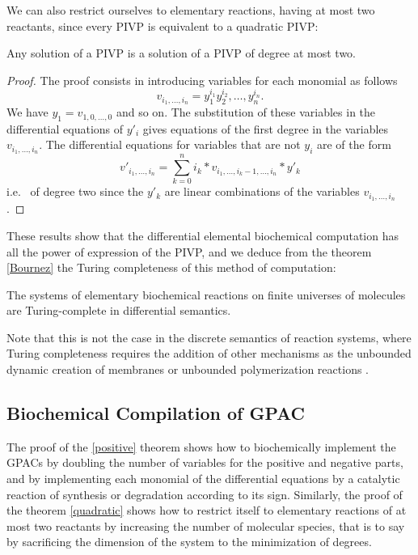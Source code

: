 \documentclass[graybox]{svmult}
\begin{document}
We can also restrict ourselves to elementary reactions, having at most two reactants, since every PIVP is equivalent to a quadratic PIVP:
\begin{theorem} \cite{CPSW05ejde} \label{quadratic}
Any solution of a PIVP is a solution of a PIVP of degree at most two.
\end{theorem}
\begin{proof}
  The proof consists in introducing variables for each monomial as follows
$$v_{i_1,\ldots,i_n}=y_1^{i_1}y_2^{i_2},\ldots,y_n^{i_n}.$$
We have $ y_1 = v_{1,0, \ldots, 0} $ and so on. The substitution of these variables in the differential equations of $ y'_i $
gives equations of the first degree in the variables $ v_{i_1, \ldots, i_n} $.
The differential equations for variables that are not $ y_i $ are of the form
$$v'_{i_1,\ldots,i_n}=\sum_{k=0}^n i_k*v_{i_1,\ldots,i_k-1,\ldots,i_n}*y'_k$$
i.e.~ of degree two since the $ y'_k $ are linear combinations of the variables $ v_{i_1, \ldots, i_n} $.
\end{proof}

These results show that the differential elemental biochemical computation has all the power of expression
of the PIVP, and we deduce from the theorem \ref{Bournez} the Turing completeness of this method of computation:
\begin{theorem} \label{turing}
The systems of elementary biochemical reactions on finite universes of molecules are Turing-complete in differential semantics.
\end{theorem}

Note that this is not the case in the discrete semantics of reaction systems,
where Turing completeness requires the addition of other mechanisms
as the unbounded dynamic creation of membranes \cite{BG06tcsb, BB92tcs}
or unbounded polymerization reactions \cite{CZ10mscs}.

\subsection{Biochemical Compilation of GPAC}

The proof of the \ref{positive} theorem shows how to biochemically implement the GPACs by doubling the number of variables for the positive and negative parts,
and by implementing each monomial of the differential equations by a catalytic reaction of synthesis or degradation according to its sign.
Similarly, the proof of the theorem \ref{quadratic} shows how to restrict itself to elementary reactions of at most two reactants by increasing the number of molecular species,
that is to say by sacrificing the dimension of the system to the minimization of degrees.
\end{document}
